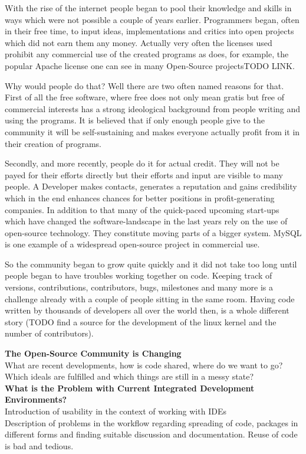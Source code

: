 \documentclass[twoside, 11pt]{scrartcl}
\begin{document}
With the rise of the internet people began to pool their knowledge and skills in ways which were not possible a couple of years earlier. Programmers began, often in their free time, to input ideas, implementations and critics into open projects which did not earn them any money. Actually very often the licenses used prohibit any commercial use of the created programs as does, for example, the popular Apache license one can see in many Open-Source projectsTODO LINK.

Why would people do that?
Well there are two often named reasons for that. First of all the free software, where free does not only mean gratis but free of commercial interests has a strong ideological background from  people writing and using the programs. It is believed that if only enough people give to the community it will be self-sustaining and makes everyone actually profit from it in their creation of programs. 

Secondly, and more recently, people do it for actual credit. They will not be payed for their efforts directly but their efforts and input are visible to many people. A Developer makes contacts, generates a reputation and gains credibility which in the end enhances chances for better positions in profit-generating companies. In addition to that many of the quick-paced upcoming start-ups which have changed the software-landscape in the last years rely on the use of open-source technology. They constitute moving parts of a bigger system. MySQL is one example of a widespread open-source project in commercial use.

So the community began to grow quite quickly and it did not take too	 long until people began to have troubles working together on code. Keeping track of versions, contributions, contributors, bugs, milestones and many more is a challenge already with a couple of people sitting in the same room. Having code written by thousands of developers all over the world then, is a whole different story (TODO find a  source for the development of the linux kernel and the number of contributors).

\textbf{The Open-Source Community is Changing}\\
What are recent developments, how is code shared, where do we want to go?
Which ideals are fulfilled and which  things are still in a messy state?\\

\textbf{What is the Problem with Current Integrated Development Environments?}\\
Introduction of usability in the context of working with IDEs\\
Description of problems in the workflow regarding spreading of code, packages in different forms and finding suitable discussion and documentation. Reuse of code is bad and tedious.
\end{document}
